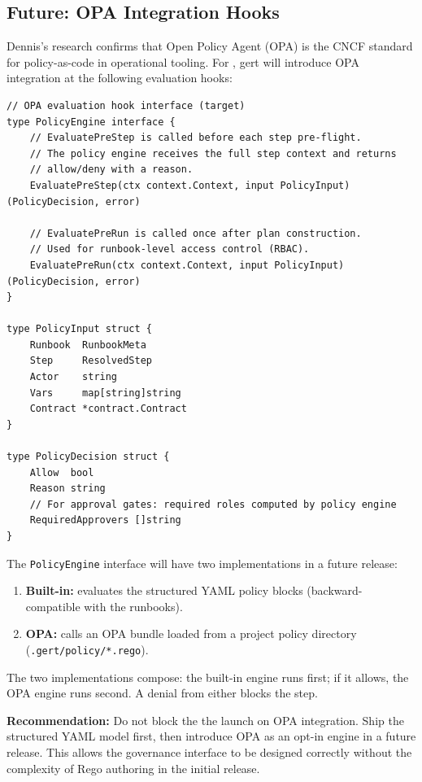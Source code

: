 \subsection{Future: OPA Integration Hooks}

Dennis's research confirms that Open Policy Agent (OPA) is the CNCF standard for
policy-as-code in operational tooling. For \textbf{}, gert will introduce OPA
integration at the following evaluation hooks:

\begin{verbatim}
// OPA evaluation hook interface (target)
type PolicyEngine interface {
    // EvaluatePreStep is called before each step pre-flight.
    // The policy engine receives the full step context and returns
    // allow/deny with a reason.
    EvaluatePreStep(ctx context.Context, input PolicyInput) (PolicyDecision, error)

    // EvaluatePreRun is called once after plan construction.
    // Used for runbook-level access control (RBAC).
    EvaluatePreRun(ctx context.Context, input PolicyInput) (PolicyDecision, error)
}

type PolicyInput struct {
    Runbook  RunbookMeta
    Step     ResolvedStep
    Actor    string
    Vars     map[string]string
    Contract *contract.Contract
}

type PolicyDecision struct {
    Allow  bool
    Reason string
    // For approval gates: required roles computed by policy engine
    RequiredApprovers []string
}
\end{verbatim}

The \texttt{PolicyEngine} interface will have two implementations in a future release:
\begin{enumerate}
  \item \textbf{Built-in:} evaluates the structured YAML policy blocks (backward-compatible
        with the runbooks).
  \item \textbf{OPA:} calls an OPA bundle loaded from a project policy directory
        (\texttt{.gert/policy/*.rego}).
\end{enumerate}

The two implementations compose: the built-in engine runs first; if it allows, the OPA engine
runs second. A denial from either blocks the step.

\textbf{Recommendation:} Do not block the the launch on OPA integration. Ship the structured
YAML model first, then introduce OPA as an opt-in engine in a future release. This allows the governance
interface to be designed correctly without the complexity of Rego authoring in the initial release.

